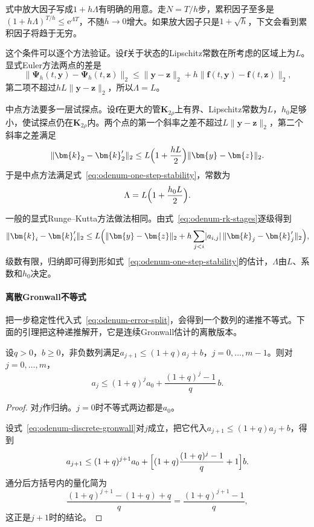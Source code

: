 式中放大因子写成$1+h\Lambda$有明确的用意。走$N=T/h$步，累积因子至多是$(1+h\Lambda)^{T/h}\leq\mathrm{e}^{\Lambda T}$，不随$h\to0$增大。如果放大因子只是$1+\sqrt{h}$，下文会看到累积因子将趋于无穷。

这个条件可以逐个方法验证。设$\bm{f}$关于状态的Lipschitz常数在所考虑的区域上为$L$。显式Euler方法两点的差是
\[
 \bigl\lVert\bm{\Psi}_h(t,\bm{y})-\bm{\Psi}_h(t,\bm{z})\bigr\rVert_2
 \leq\lVert\bm{y}-\bm{z}\rVert_2+h\bigl\lVert\bm{f}(t,\bm{y})-\bm{f}(t,\bm{z})\bigr\rVert_2,
\]
第二项不超过$hL\lVert\bm{y}-\bm{z}\rVert_2$，所以$\Lambda=L$。

中点方法要多一层试探点。设$\bm{f}$在更大的管$\bm{K}_{2\rho}$上有界、Lipschitz常数为$L$，$h_0$足够小，使试探点仍在$\bm{K}_{2\rho}$内。两个点的第一个斜率之差不超过$L\lVert\bm{y}-\bm{z}\rVert_2$，第二个斜率之差满足
\[
 \lVert\bm{k}_2-\bm{k}_2'\rVert_2\leq L\Bigl(1+\frac{hL}{2}\Bigr)\lVert\bm{y}-\bm{z}\rVert_2.
\]
于是中点方法满足式~\eqref{eq:odenum-one-step-stability}，常数为
\[
 \Lambda=L\Bigl(1+\frac{h_0L}{2}\Bigr).
\]

一般的显式Runge--Kutta方法做法相同。由式~\eqref{eq:odenum-rk-stages}逐级得到
\[
 \lVert\bm{k}_i-\bm{k}_i'\rVert_2\leq L\Bigl(\lVert\bm{y}-\bm{z}\rVert_2+h\sum_{j<i}\lvert a_{i,j}\rvert\,\lVert\bm{k}_j-\bm{k}_j'\rVert_2\Bigr),
\]
级数有限，归纳即可得到形如式~\eqref{eq:odenum-one-step-stability}的估计，$\Lambda$由$L$、系数和$h_0$决定。

\paragraph{离散Gronwall不等式}
把一步稳定性代入式~\eqref{eq:odenum-error-split}，会得到一个数列的递推不等式。下面的引理把这种递推解开，它是连续Gronwall估计的离散版本。

\begin{lemma}[离散Gronwall不等式]
 \label{lem:odenum-discrete-gronwall}
 设$q>0$，$b\geq0$，非负数列满足$a_{j+1}\leq(1+q)a_j+b$，$j=0,\ldots,m-1$。则对$j=0,\ldots,m$，
 \begin{equation}
  a_j\leq(1+q)^{j}a_0+\frac{(1+q)^{j}-1}{q}\,b.
  \label{eq:odenum-discrete-gronwall}
 \end{equation}
\end{lemma}

\begin{proof}
 对$j$作归纳。$j=0$时不等式两边都是$a_0$。

 设式~\eqref{eq:odenum-discrete-gronwall}对$j$成立，把它代入$a_{j+1}\leq(1+q)a_j+b$，得到
 \[
  a_{j+1}\leq(1+q)^{j+1}a_0+\Bigl[(1+q)\frac{(1+q)^{j}-1}{q}+1\Bigr]b.
 \]
 通分后方括号内的量化简为
 \[
  \frac{(1+q)^{j+1}-(1+q)+q}{q}=\frac{(1+q)^{j+1}-1}{q},
 \]
 这正是$j+1$时的结论。
\end{proof}

